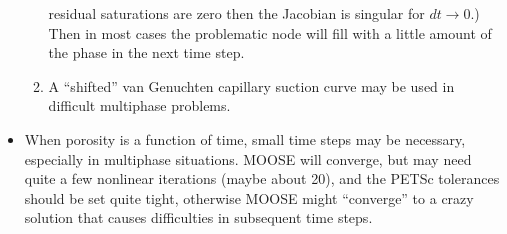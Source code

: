 \documentclass[]{scrreprt}
\begin{document}
\begin{itemize}
\begin{enumerate}
  residual saturations are zero then the Jacobian is singular for
  $dt\rightarrow 0$.)  Then in most cases the problematic node will
  fill with a little amount of the phase in the next time step.
\item A ``shifted'' van Genuchten capillary suction curve may be used
  in difficult multiphase problems.
\end{enumerate}
\item When porosity is a function of time, small time steps may be
  necessary, especially in multiphase situations.  MOOSE will
  converge, but may need quite a few nonlinear iterations (maybe about
  20), and the PETSc tolerances should be set quite tight, otherwise
  MOOSE might ``converge'' to a crazy solution that causes
  difficulties in subsequent time steps.
\end{itemize}
\end{document}
